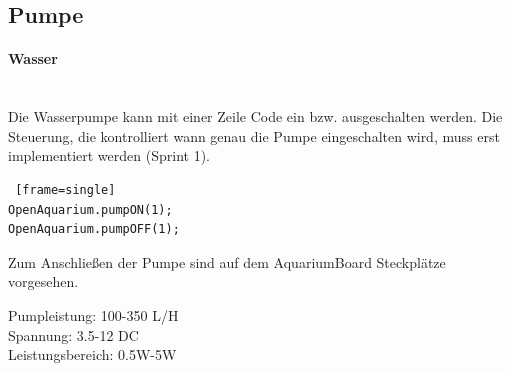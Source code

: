 \documentclass[11pt]{article}
\begin{document}
\subsection{Pumpe}
\paragraph{Wasser} \mbox{} \\
Die Wasserpumpe kann mit einer Zeile Code ein bzw. ausgeschalten werden. Die Steuerung, die kontrolliert wann genau die Pumpe eingeschalten wird, muss erst implementiert werden (Sprint 1).

\begin{lstlisting} [frame=single]
OpenAquarium.pumpON(1); 
OpenAquarium.pumpOFF(1);
\end{lstlisting}
Zum Anschlie{\ss}en der Pumpe sind auf dem AquariumBoard Steckplätze vorgesehen. \\
\begin{minipage}{5in}
  \centering
\end{minipage}
Pumpleistung: 100-350 L/H \\
Spannung: 3.5-12 DC \\
Leistungsbereich: 0.5W-5W \\
\newpage
\end{document}

